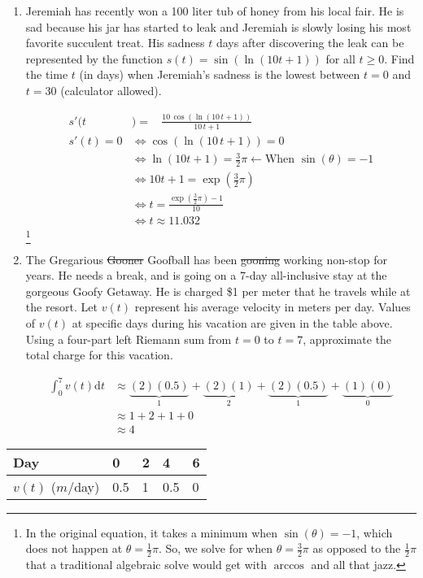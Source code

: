 \documentclass[]{article}
\begin{document}
\begin{enumerate}
	\pagebreak\noindent
	
	\item Jeremiah has recently won a 100 liter tub of honey from his local fair. He is sad because his jar has started to leak and Jeremiah is slowly losing his most favorite succulent treat. His sadness $t$ days after discovering the leak can be represented by the function $\displaystyle s(t)=\sin\left(\ln\left(10t+1\right)\right)$ for all $t\geq0$. Find the time $t$ (in days) when Jeremiah's sadness is the lowest between $t=0$ and $t=30$ (calculator allowed).
	
	\begin{align*}
		s'(t&)=\:\:\:\:\frac{10 \, \cos\left(\ln\left(10 \, t + 1\right)\right)}{10 \, t + 1} \\
		s'(t)=0 &\Longleftrightarrow \cos\left(\ln\left(10 \, t + 1\right)\right)=0 \\
		&\Longleftrightarrow \ln(10t+1) = \frac{3}{2}\pi \leftarrow \boxed{\text{When $\sin(\theta) = -1$}} \\
		&\Longleftrightarrow 10t+1 = \exp\left(\frac{3}{2}\pi\right) \\
		&\Longleftrightarrow t = \frac{\exp\left(\frac{3}{2}\pi\right)-1}{10} \\
		&\Longleftrightarrow t \approx \boxed{11.032}
	\end{align*}\footnote{In the original equation, it takes a minimum when $\sin(\theta)=-1$, which does not happen at $\displaystyle \theta=\frac{1}{2}\pi$. So, we solve for when $\displaystyle \theta=\frac{3}{2}\pi$ as opposed to the $\displaystyle \frac{1}{2}\pi$ that a traditional algebraic solve would get with $\displaystyle \arccos$ and all that jazz.}
	
	\item The Gregarious \st{Gooner} Goofball has been \st{gooning} working non-stop for years. He needs a break, and is going on a 7-day all-inclusive stay at the gorgeous Goofy Getaway. He is charged \$1 per meter that he travels while at the resort. Let $v(t)$ represent his average velocity in meters per day. Values of $v(t)$ at specific days during his vacation are given in the table above. Using a four-part left Riemann sum from $t=0$ to $t=7$, approximate the total charge for this vacation.
	
	\begin{align*}
		\int_{0}^{7}v(t)\text{d}t &\approx \underbrace{(2)(0.5)}_{1}+\underbrace{(2)(1)}_{2}+\underbrace{(2)(0.5)}_{1}+\underbrace{(1)(0)}_{0} \\
		&\approx 1+2+1+0 \\
		&\approx \boxed{4}
	\end{align*}
\end{enumerate}

\begin{table}
	\centering
	\begin{tabular}{|l|l|l|l|l|}
		\hline
		Day              & 0 & 2 & 4   & 6 \\ \hline
		$v(t)$ ($m$/day) & 0.5 & 1 & 0.5 & 0 \\ \hline
	\end{tabular}
\end{table}
\end{document}
